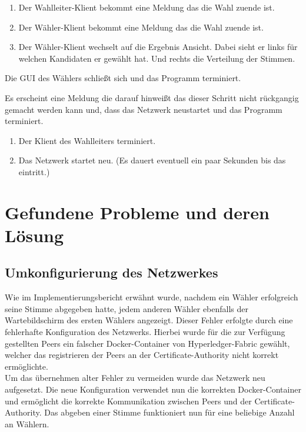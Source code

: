 \documentclass[parskip=full]{scrartcl}
\begin{document}
		{\begin{enumerate}
			\item Der Wahlleiter-Klient bekommt eine Meldung das die Wahl zuende ist.
			\item Der Wähler-Klient bekommt eine Meldung das die Wahl zuende ist.
			\item Der Wähler-Klient wechselt auf die Ergebnis Ansicht. Dabei sieht er links für welchen Kandidaten er gewählt hat. Und rechts die Verteilung der Stimmen.
		\end{enumerate}}

		{Die GUI des Wählers schließt sich und das Programm terminiert.}


		{Es erscheint eine Meldung die darauf hinweißt das dieser Schritt nicht rückgangig gemacht werden kann und, dass das Netzwerk neustartet und das Programm terminiert.}

		{\begin{enumerate}
			\item Der Klient des Wahlleiters terminiert.
			\item Das Netzwerk startet neu. (Es dauert eventuell ein paar Sekunden bis das eintritt.)
		\end{enumerate}}

\section{Gefundene Probleme und deren Lösung}
\subsection{Umkonfigurierung des Netzwerkes}
Wie im Implementierungsbericht erwähnt wurde, nachdem ein Wähler erfolgreich seine Stimme abgegeben hatte, jedem anderen Wähler ebenfalls der Wartebildschirm des ersten Wählers angezeigt. Dieser Fehler erfolgte durch eine fehlerhafte Konfiguration des Netzwerks. Hierbei wurde für die zur Verfügung gestellten Peers ein falscher Docker-Container von Hyperledger-Fabric gewählt, welcher das registrieren der Peers an der Certificate-Authority nicht korrekt ermöglichte.
\\
Um das übernehmen alter Fehler zu vermeiden wurde das Netzwerk neu aufgesetzt. Die neue Konfiguration verwendet nun die korrekten Docker-Container und ermöglicht die korrekte Kommunikation zwischen Peers und der Certificate-Authority. Das abgeben einer Stimme funktioniert nun für eine beliebige Anzahl an Wählern.
\end{document}
